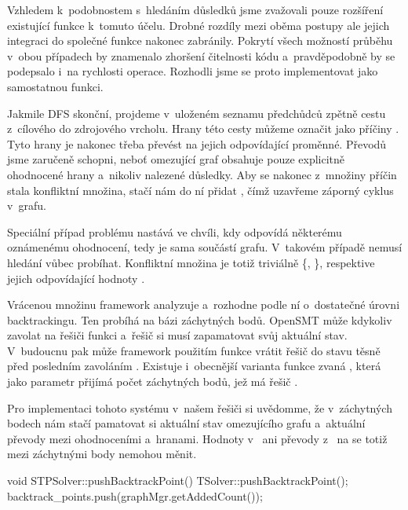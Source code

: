 Vzhledem k~podobnostem s~hledáním důsledků jsme zvažovali pouze rozšíření existující funkce  k~tomuto účelu. Drobné rozdíly mezi oběma postupy ale jejich integraci do společné funkce nakonec zabránily. Pokrytí všech možností průběhu v~obou případech by znamenalo zhoršení čitelnosti kódu a~pravděpodobně by se podepsalo i~na rychlosti operace. Rozhodli jsme se proto implementovat  jako samostatnou funkci.

Jakmile DFS skonční, projdeme v~uloženém seznamu předchůdců zpětně cestu z~cílového do zdrojového vrcholu. Hrany této cesty můžeme označit jako příčiny . Tyto hrany je nakonec třeba převést na jejich odpovídající  proměnné. Převodů jsme zaručeně schopni, neboť omezující graf obsahuje pouze explicitně ohodnocené hrany a~nikoliv nalezené důsledky. Aby se nakonec z~množiny příčin stala konfliktní množina, stačí nám do ní přidat , čímž uzavřeme záporný cyklus v~grafu. 

Speciální případ problému nastává ve chvíli, kdy  odpovídá některému oznámenému ohodnocení, tedy je sama součástí grafu. V~takovém případě nemusí hledání vůbec probíhat. Konfliktní množina je totiž triviálně \{, \}, respektive jejich odpovídající hodnoty .

Vrácenou množinu framework analyzuje a~rozhodne podle ní o~dostatečné úrovni backtrackingu. Ten probíhá na bázi záchytných bodů. OpenSMT může kdykoliv zavolat na řešiči funkci  a~řešič si musí zapamatovat svůj aktuální stav. V~budoucnu pak může framework použitím funkce  vrátit řešič do stavu těsně před posledním zavoláním . Existuje i~obecnější varianta funkce zvaná , která jako parametr přijímá počet záchytných bodů, jež má řešič .

Pro implementaci tohoto systému v~našem řešiči si uvědomme, že v~záchytných bodech nám stačí pamatovat si aktuální stav omezujícího grafu a~aktuální převody mezi ohodnoceními a~hranami. Hodnoty v~ ani převody z~ na  se totiž mezi záchytnými body nemohou měnit.

\begin{code}
void STPSolver::pushBacktrackPoint() {
	TSolver::pushBacktrackPoint();
	backtrack_points.push(graphMgr.getAddedCount());
}
\end{code}

